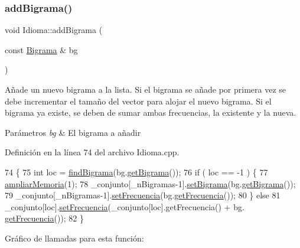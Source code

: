 \subsubsection{\texorpdfstring{add\+Bigrama()}{addBigrama()}}
{\footnotesize\ttfamily void Idioma\+::add\+Bigrama (\begin{DoxyParamCaption}\item[{const \hyperlink{classBigrama}{Bigrama} \&}]{bg }\end{DoxyParamCaption})}



Añade un nuevo bigrama a la lista. Si el bigrama se añade por primera vez se debe incrementar el tamaño del vector para alojar el nuevo bigrama. Si el bigrama ya existe, se deben de sumar ambas frecuencias, la existente y la nueva. 


\begin{DoxyParams}{Parámetros}
{\em bg} & El bigrama a añadir \\
\hline
\end{DoxyParams}


Definición en la línea 74 del archivo Idioma.\+cpp.


\begin{DoxyCode}
74                                           \{
75     \textcolor{keywordtype}{int} loc = \hyperlink{classIdioma_a111e1cdd3070e81782b6890e14391804}{findBigrama}(bg.\hyperlink{classBigrama_adb616b62beeaa4fb9303cd647ea3fba3}{getBigrama}());
76     \textcolor{keywordflow}{if} ( loc == -1 ) \{
77         \hyperlink{classIdioma_a106ba8d7b9956a97243abc33a3ccea0b}{ampliarMemoria}(1);
78         \_conjunto[\_nBigramas-1].\hyperlink{classBigrama_ad9f512b7f00068f100f2fdfb5de32746}{setBigrama}(bg.\hyperlink{classBigrama_adb616b62beeaa4fb9303cd647ea3fba3}{getBigrama}());
79         \_conjunto[\_nBigramas-1].\hyperlink{classBigrama_a63dd808514f1eaf233f49cbbe3c2af82}{setFrecuencia}(bg.\hyperlink{classBigrama_a5a7f1ec845ac5971c8d788c12171a9c9}{getFrecuencia}());
80     \} \textcolor{keywordflow}{else}
81         \_conjunto[loc].\hyperlink{classBigrama_a63dd808514f1eaf233f49cbbe3c2af82}{setFrecuencia}(\_conjunto[loc].getFrecuencia() + bg.
      \hyperlink{classBigrama_a5a7f1ec845ac5971c8d788c12171a9c9}{getFrecuencia}());
82 \}
\end{DoxyCode}
Gráfico de llamadas para esta función\+:
\mbox{\label{classIdioma_a106ba8d7b9956a97243abc33a3ccea0b}} 
